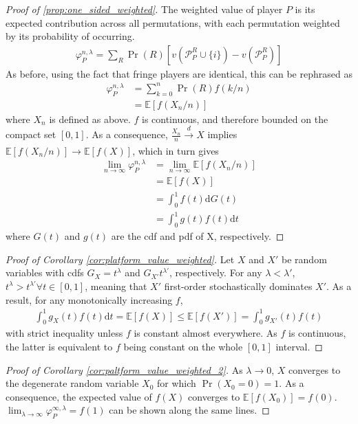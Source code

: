 \documentclass[a4paper]{article}
\newcommand{\dt}{\mathrm{d}t}
\newcommand{\dG}{\mathrm{d}G}
\newcommand{\E}{\mathbb{E}}
\begin{document}
\begin{proof}[Proof of \cref{prop:one_sided_weighted}]
    The weighted value of player $P$ is its expected contribution across all permutations, with each permutation weighted by its probability of occurring.
    \begin{align*}
        \varphi_P^{n, \lambda} = \sum_R \Pr(R) [v(\mathcal{P}_P^R \cup \{i\}) - v(\mathcal{P}_P^R)]
    \end{align*}
    As before, using the fact that fringe players are identical, this can be rephrased as
    \begin{align*}
        \varphi_P^{n, \lambda} &= \sum_{k=0}^n \Pr(R) f(k/n) \\
        &= \E[f(X_n / n)]
    \end{align*}
    where $X_n$ is defined as above.
    $f$ is continuous, and therefore bounded on the compact set $[0, 1]$.
    As a consequence, $\frac{X_n}{n} \xrightarrow[]{d} X$ implies $\E[f(X_n / n)] \to \E[f(X)]$, which in turn gives
    \begin{align*}
        \lim_{n \to \infty} \varphi_P^{n, \lambda} &= \lim_{n \to \infty} \E[f(X_n / n)] \\
        &= \E[f(X)] \\
        &= \int_0^1 f(t) \dG(t) \\
        &= \int_0^1 g(t)f(t) \dt
    \end{align*}
    where $G(t)$ and $g(t)$ are the cdf and pdf of X, respectively.
\end{proof}

\begin{proof}[Proof of Corollary \ref{cor:platform_value_weighted}]
    Let $X$ and $X'$ be random variables with cdfs $G_X = t^\lambda$ and $G_{X'}t^{\lambda'}$, respectively.
    For any $\lambda < \lambda'$, $t^\lambda > t^{\lambda'} \forall t \in [0, 1]$, meaning that $X'$ first-order stochastically dominates $X'$.
    As a result, for any monotonically increasing $f$,
    \begin{align*}
        \int_0^1 g_X(t)f(t) \dt = \E[f(X)] \leq \E[f(X')] = \int_0^1 g_{X'}(t)f(t)
    \end{align*}
    with strict inequality unless $f$ is constant almost everywhere.
    As $f$ is continuous, the latter is equivalent to $f$ being constant on the whole $[0, 1]$ interval.
\end{proof}

\begin{proof}[Proof of Corollary \ref{cor:paltform_value_weighted_2}]
    As $\lambda \to 0$, $X$ converges to the degenerate random variable $X_0$ for which $\Pr(X_0 = 0) = 1$.
    As a consequence, the expected value of $f(X)$ converges to $\E[f(X_0)] = f(0)$.
    $\lim_{\lambda \to \infty} \varphi^{\infty, \lambda}_P = f(1)$ can be shown along the same lines.
\end{proof}
\end{document}
